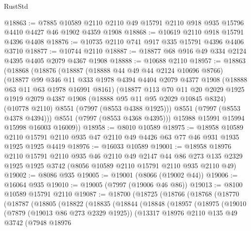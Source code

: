 \begin{lexlean}{RustStd}
\begin{coremodule}
{\begin{coremodule}
{{{{{{{{{{{{{{{{{{{{{{{{{{{{{{{{{{{{{{{{{{{@18863 := @7885
    @10589
    @2110
    @2110
    @49
    @15791
    @2110
    @918
    @935
    @15796
    @4410
    @4427
    @46
    @1902
    @4359
    @1908
@18868 := @10619 @2110 @918 @15791 @4396 @4408
@18876 := @10735 @2110 @741 @917 @335 @15791 @4396 @4406 @3710
@18877 := @10744 @2110
@18887 := @18877 @68 @916 @49 @334 @2124 @4395 @4405 @2079 @4367 @1908
@18888 := @10688 @2110
@18957 := @18863
    (@18868
      (@18876
        (@18887
          (@18888 @44 @49 @44 @2124 @10696 @8766)
          (@18877
            @99
            @346
            @11
            @333
            @1978
            @4394
            @4404
            @2079
            @4377
            @1908
            (@18888 @63 @11 @63 @1978 @16991 @8161)
            (@18877
              @113
              @70
              @11
              @20
              @2029
              @1925
              @1919
              @2079
              @4387
              @1908
              (@18888 @95 @11 @95 @2029 @10845 @8324)
              (@10778 @2110)
              @8551
              (@7997 (@8553 @4388 @1925)))
            @8551
            (@7997 (@8553 @4378 @4394)))
          @8551
          (@7997 (@8553 @4368 @4395)))
        @15988
        @15991
        @15994
        @15998
        @16003
        @16009))
@18958 := @8010 @10589
@18975 := @18958
    @10589
    @2110
    @15791
    @2110
    @935
    @47
    @2110
    @49
    @4426
    @63
    @77
    @46
    @931
    @1935
    @1925
    @1925
    @4419
@18976 := @16033 @10589
@19001 := @18958
    @18976
    @2110
    @15791
    @2110
    @935
    @46
    @2110
    @49
    @2147
    @44
    @86
    @273
    @135
    @2329
    @1925
    @1925
    @3742
    (@8056 @10589 @2110 @15791 @2110 @935 @2110 @49)
@19002 := @8086 @935
@19005 := @19001 (@8066 (@19002 @44))
@19006 := @16064 @935
@19010 := @19005 (@7997 (@19006 @46 @86))
@19013 := @8100 @10589 @15791 @2110
@19087 := @18700
    (@18725
      (@18766
        (@18768
          (@18770
            (@18787
              (@18805
                (@18822
                  (@18835
                    (@18844
                      (@18848
                        (@18957
                          (@18975
                            (@19010
                              (@7879 (@19013 @86 @273 @2329 @1925))
                              (@13317
                                @18976
                                @2110
                                @135
                                @49
                                @3742
                                (@7948
                                  @18976
}}}}}}}}}}}}}}}}}}}}}}}}}}}}}}}}}}}}}}}}}}}
\end{coremodule}}
\end{coremodule}
\end{lexlean}
